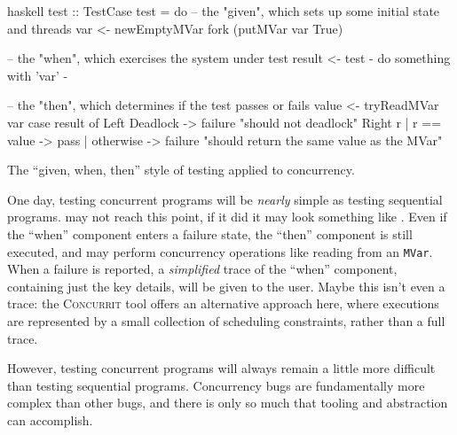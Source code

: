\begin{listing}
\centering
\begin{cminted}{haskell}
test :: TestCase
test = do
    -- the "given", which sets up some initial state and threads
    var <- newEmptyMVar
    fork (putMVar var True)

    -- the "when", which exercises the system under test
    result <- test {- do something with 'var' -}

    -- the "then", which determines if the test passes or fails
    value <- tryReadMVar var
    case result of
      Left Deadlock -> failure "should not deadlock"
      Right r
        | r == value -> pass
        | otherwise -> failure "should return the same value as the MVar"
\end{cminted}
\caption{The ``given, when, then'' style of testing applied to concurrency.}\label{lst:3part}
\end{listing}

One day, testing concurrent programs will be \emph{nearly} simple as
testing sequential programs.  \dejafu{} may not reach this point, if
it did it may look something like .  Even if the
``when'' component enters a failure state, the ``then'' component is
still executed, and may perform concurrency operations like reading
from an \verb|MVar|.  When a failure is reported, a \emph{simplified}
trace of the ``when'' component, containing just the key details, will
be given to the user.  Maybe this isn't even a trace: the
\textsc{Concurrit}\cite{elmas2013} tool offers an alternative approach
here, where executions are represented by a small collection of
scheduling constraints, rather than a full trace.

However, testing concurrent programs will always remain a little more
difficult than testing sequential programs.  Concurrency bugs are
fundamentally more complex than other bugs, and there is only so much
that tooling and abstraction can accomplish.
